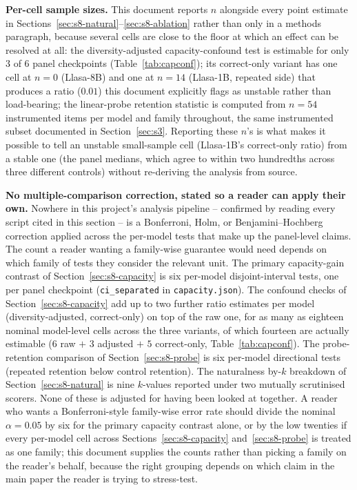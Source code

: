 \documentclass[11pt]{article}
\begin{document}
\textbf{Per-cell sample sizes.} This document reports $n$ alongside every
point estimate in Sections~\ref{sec:s8-natural}--\ref{sec:s8-ablation} rather
than only in a methods paragraph, because several cells are close to the
floor at which an effect can be resolved at all: the diversity-adjusted
capacity-confound test is estimable for only $3$ of $6$ panel checkpoints
(Table~\ref{tab:capconf}); its correct-only variant has one cell at $n{=}0$
(Llasa-8B) and one at $n{=}14$ (Llasa-1B, repeated side) that produces a
ratio ($0.01$) this document explicitly flags as unstable rather than
load-bearing; the linear-probe retention statistic is computed from $n{=}54$
instrumented items per model and family throughout, the same instrumented
subset documented in Section~\ref{sec:s3}. Reporting these $n$'s is what
makes it possible to tell an unstable small-sample cell (Llasa-1B's
correct-only ratio) from a stable one (the panel medians, which agree to
within two hundredths across three different controls) without re-deriving
the analysis from source.

\textbf{No multiple-comparison correction, stated so a reader can apply their
own.} Nowhere in this project's analysis pipeline -- confirmed by reading
every script cited in this section -- is a Bonferroni, Holm, or
Benjamini--Hochberg correction applied across the per-model tests that make up
the panel-level claims. The count a reader wanting a family-wise guarantee
would need depends on which family of tests they consider the relevant unit.
The primary capacity-gain contrast of Section~\ref{sec:s8-capacity} is six
per-model disjoint-interval tests, one per panel checkpoint
(\texttt{ci\_separated} in \texttt{capacity.json}). The confound checks of
Section~\ref{sec:s8-capacity} add up to two further ratio estimates per model
(diversity-adjusted, correct-only) on top of the raw one, for as many as
eighteen nominal model-level cells across the three variants, of which
fourteen are actually estimable ($6$ raw $+$ $3$ adjusted $+$ $5$
correct-only, Table~\ref{tab:capconf}). The probe-retention comparison of
Section~\ref{sec:s8-probe} is six per-model directional tests (repeated
retention below control retention). The naturalness by-$k$ breakdown of
Section~\ref{sec:s8-natural} is nine $k$-values reported under two mutually
scrutinised scorers. None of these is adjusted for having been looked at
together. A reader who wants a Bonferroni-style family-wise error rate should
divide the nominal $\alpha=0.05$ by six for the primary capacity contrast
alone, or by the low twenties if every per-model cell across
Sections~\ref{sec:s8-capacity} and~\ref{sec:s8-probe} is treated as one
family; this document supplies the counts rather than picking a family on the
reader's behalf, because the right grouping depends on which claim in the
main paper the reader is trying to stress-test.
\end{document}
